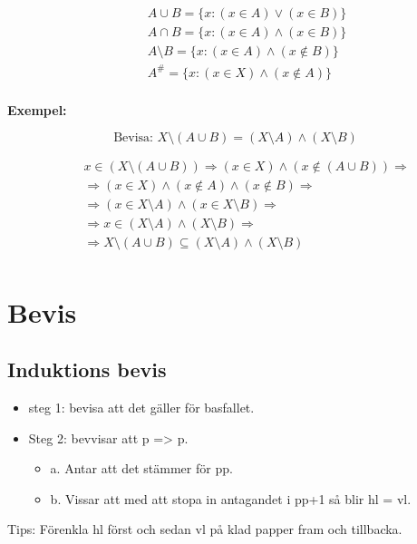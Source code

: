 \begin{align*}
  &\quad A \cup B = \{ x:(x \in A) \lor (x \in B)\} \\
  &\quad A \cap B = \{ x:(x \in A) \land (x \in B)\} \\
  &\quad A \setminus B = \{ x:(x \in A) \land (x \notin B)\} \\
  &\quad A^{\text{\#}} = \{ x:(x \in X) \land (x \notin A)\} \\
\end{align*}

\textbf{Exempel:}\par
\begin{equation}
  \text{Bevisa: } X \setminus (A \cup B) = (X \setminus A) \land (X \setminus B) 
\end{equation}

\begin{align*}
  &\quad x \in (X \setminus (A \cup B)) \Rightarrow (x \in X) \land (x \notin (A \cup B)) \Rightarrow \\
  &\quad \Rightarrow (x \in X) \land (x \notin A) \land (x \notin B) \Rightarrow \\
  &\quad \Rightarrow (x \in X \setminus A) \land (x \in X \setminus B) \Rightarrow \\
  &\quad \Rightarrow x \in (X \setminus A) \land (X \setminus B) \Rightarrow \\
  &\quad \Rightarrow X \setminus (A \cup B) \subseteq (X \setminus A) \land (X \setminus B) \\
\end{align*}


\newpage

\section{Bevis}
\subsection{Induktions bevis}
\begin{itemize}
  \item steg 1: bevisa att det gäller för basfallet.
  \item Steg 2: bevvisar att p => p.
  \begin{itemize}
    \item a. Antar att det stämmer för pp.
    \item b. Vissar att med att stopa in antagandet i pp+1 så blir hl = vl.
  \end{itemize}
\end{itemize}
Tips: Förenkla hl först och sedan vl på klad papper fram och tillbacka. \newline

